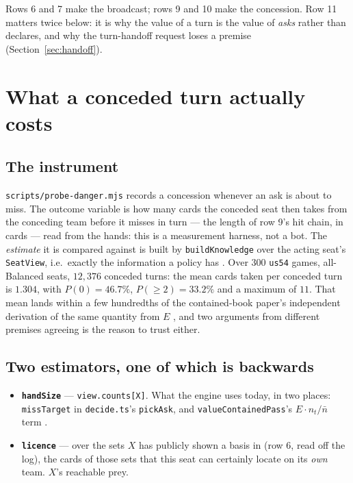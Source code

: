 \documentclass[11pt]{article}
\newcommand{\code}[1]{\texttt{#1}}
\newcommand{\usff}{\code{us54}}
\begin{document}
\noindent Rows 6 and 7 make the broadcast; rows 9 and 10 make the concession. Row 11 matters twice
below: it is why the value of a turn is the value of \emph{asks} rather than declares, and why the
turn-handoff request loses a premise (Section~\ref{sec:handoff}).

\section{What a conceded turn actually costs}
\label{sec:cost}

\subsection{The instrument}
\label{sec:instrument}

\code{scripts/probe-danger.mjs} records a concession whenever an ask is about to miss. The outcome
variable is how many cards the conceded seat then takes from the conceding team before it misses in
turn --- the length of row 9's hit chain, in cards --- read from the hands: this is a measurement
harness, not a bot. The \emph{estimate} it is compared against is built by \code{buildKnowledge}
over the acting seat's \code{SeatView}, i.e.\ exactly the information a policy has
\cite{concession,repo}. Over 300 \usff{} games, all-Balanced seats, $12{,}376$ conceded turns: the
mean cards taken per conceded turn is $\mathbf{1.304}$, with $P(0) = 46.7\%$, $P(\ge 2) = 33.2\%$
and a maximum of $11$. That mean lands within a few hundredths of the contained-book paper's
independent derivation of the same quantity from $E$ \cite{containedpaper,containment}, and two
arguments from different premises agreeing is the reason to trust either.

\subsection{Two estimators, one of which is backwards}
\label{sec:estimators}

\begin{itemize}
\item \textbf{\code{handSize}} --- \code{view.counts[X]}. What the engine uses today, in two places:
  \code{missTarget} in \code{decide.ts}'s \code{pickAsk}, and \code{valueContainedPass}'s $E \cdot
  n_t / \bar{n}$ term \cite{repo,containedpaper}.
\item \textbf{\code{licence}} --- over the sets $X$ has publicly shown a basis in (row 6, read off
  the log), the cards of those sets that this seat can certainly locate on its \emph{own} team.
  $X$'s reachable prey.
\end{itemize}
\end{document}
